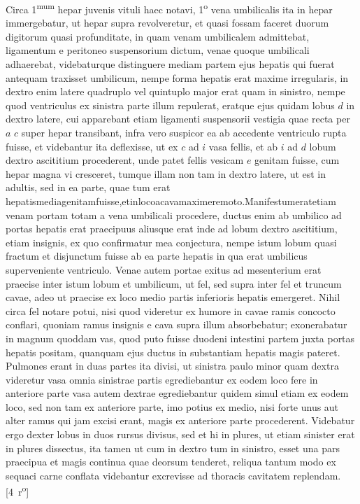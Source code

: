 \pend 
\pstart Circa 1\textsuperscript{mum} hepar juvenis vituli haec notavi, 1\textsuperscript{o} vena umbilicalis ita in hepar immergebatur, ut hepar supra revolveretur, et quasi fossam faceret duorum digitorum quasi profunditate, in quam venam umbilicalem admittebat, ligamentum e peritoneo suspensorium dictum, venae quoque umbilicali adhaerebat, videbaturque distinguere mediam partem ejus hepatis qui fuerat antequam traxisset umbilicum, nempe forma hepatis erat maxime irregularis, in dextro enim latere quadruplo vel quintuplo major erat quam in sinistro, nempe quod ventriculus ex sinistra parte illum repulerat, eratque ejus quidam lobus $d$ in dextro latere, cui apparebant etiam ligamenti suspensorii vestigia quae recta per $a$ $c$ super hepar transibant, infra vero suspicor ea ab accedente ventriculo rupta fuisse, et videbantur ita deflexisse, ut ex $c$ ad $i$ vasa fellis, et ab $i$ ad $d$ lobum dextro ascititium procederent, unde patet fellis vesicam $e$ genitam fuisse, cum hepar magna vi cresceret, tumque illam non tam in dextro latere, ut est in adultis, sed in ea parte, quae tum erat hepatis\hfill media\hfill genitam\hfill fuisse,\hfill et\hfill in\hfill loco\hfill a\hfill cava\hfill maxime\hfill remoto.\hfill Manifestum\hfill erat\hfill etiam
\pend
\newpage
\pstart\noindent venam portam totam a vena umbilicali procedere, ductus enim ab umbilico ad portas hepatis erat praecipuus aliusque erat inde ad lobum dextro ascititium, etiam insignis, ex quo confirmatur mea conjectura, nempe istum lobum quasi fractum et disjunctum fuisse ab ea parte hepatis in qua erat umbilicus superveniente ventriculo. Venae autem portae exitus ad mesenterium erat praecise inter istum lobum et umbilicum, ut fel, sed supra inter fel et truncum cavae, adeo ut praecise ex loco medio partis inferioris hepatis emergeret.
\pend
\pstart
Nihil circa fel notare potui, nisi quod videretur ex humore in cavae ramis concocto conflari, quoniam ramus insignis e cava supra illum absorbebatur;  exonerabatur in magnum quoddam vas, quod puto fuisse duodeni intestini partem juxta portas hepatis positam, quanquam ejus ductus in substantiam hepatis magis pateret. Pulmones erant in duas partes ita divisi, ut sinistra paulo minor quam dextra videretur vasa omnia sinistrae partis egrediebantur ex eodem loco fere in anteriore parte vasa autem dextrae  egrediebantur quidem simul etiam ex eodem loco, sed non tam ex anteriore parte, imo potius ex medio, nisi forte unus aut alter ramus qui jam excisi erant, magis ex anteriore parte procederent. Videbatur ergo dexter lobus in duos rursus divisus, sed et hi in plures, ut etiam sinister erat in plures dissectus, ita tamen ut cum in dextro tum in sinistro, esset una pars praecipua et magis continua quae deorsum tenderet, reliqua tantum modo ex sequaci carne conflata videbantur excrevisse ad thoracis cavitatem replendam.
[4~r\textsuperscript{o}]
\pend
